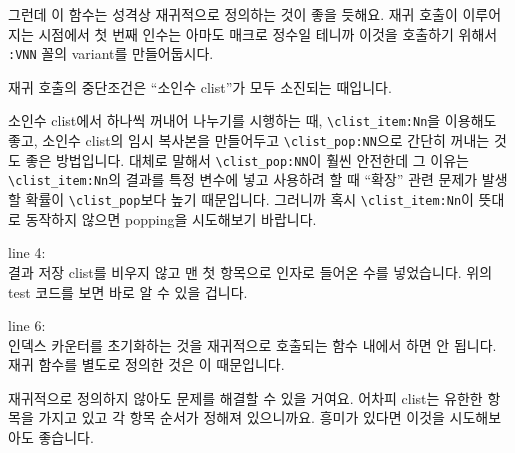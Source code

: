 \documentclass[a4paper,amsmath]{oblivoir}
\begin{document}
그런데 이 함수는 성격상 재귀적으로 정의하는 것이 좋을 듯해요. 재귀 호출이 이루어지는 시점에서 
첫 번째 인수는 아마도 매크로 정수일 테니까 이것을 호출하기 위해서 \verb|:VNN| 꼴의 variant를
만들어둡시다.

재귀 호출의 중단조건은 “소인수 clist”가 모두 소진되는 때입니다. 

소인수 clist에서 하나씩 꺼내어 나누기를 시행하는 때, \verb|\clist_item:Nn|을 이용해도 좋고,
소인수 clist의 임시 복사본을 만들어두고 \verb|\clist_pop:NN|으로 간단히 꺼내는 것도 좋은 
방법입니다. 대체로 말해서 \verb|\clist_pop:NN|이 훨씬 안전한데 그 이유는 \verb|\clist_item:Nn|의
결과를 특정 변수에 넣고 사용하려 할 때 “확장” 관련 문제가 발생할 확률이 \verb|\clist_pop|보다
높기 때문입니다. 그러니까 혹시 \verb|\clist_item:Nn|이 뜻대로 동작하지 않으면 popping을 시도해보기
바랍니다.


line 4: \\
결과 저장 clist를 비우지 않고 맨 첫 항목으로 인자로 들어온 수를 넣었습니다.
위의 test 코드를 보면 바로 알 수 있을 겁니다.

\medskip

line 6: \\
인덱스 카운터를 초기화하는 것을 재귀적으로 호출되는 함수 내에서 하면 안 됩니다.
재귀 함수를 별도로 정의한 것은 이 때문입니다.

\medskip

재귀적으로 정의하지 않아도 문제를 해결할 수 있을 거여요. 어차피 clist는 유한한 항목을
가지고 있고 각 항목 순서가 정해져 있으니까요. 흥미가 있다면 이것을 시도해보아도 좋습니다.
\end{document}
